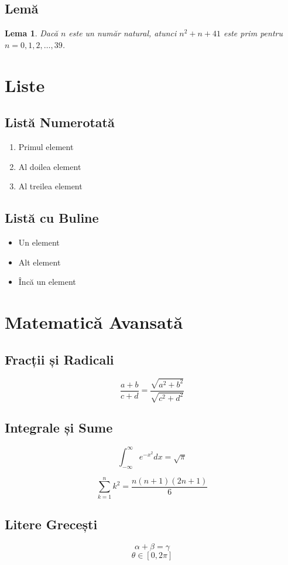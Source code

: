 \documentclass[12pt,a4paper]{article}
\newtheorem{lema}{Lema}
\begin{document}
\subsection{Lemă}
\begin{lema}
Dacă $n$ este un număr natural, atunci $n^2 + n + 41$ este prim pentru $n = 0, 1, 2, \ldots, 39$.
\end{lema}

\section{Liste}
\subsection{Listă Numerotată}
\begin{enumerate}
\item Primul element
\item Al doilea element
\item Al treilea element
\end{enumerate}

\subsection{Listă cu Buline}
\begin{itemize}
\item Un element
\item Alt element
\item Încă un element
\end{itemize}

\section{Matematică Avansată}
\subsection{Fracții și Radicali}
$$\frac{a + b}{c + d} = \frac{\sqrt{a^2 + b^2}}{\sqrt{c^2 + d^2}}$$

\subsection{Integrale și Sume}
$$\int_{-\infty}^{\infty} e^{-x^2} dx = \sqrt{\pi}$$

$$\sum_{k=1}^{n} k^2 = \frac{n(n+1)(2n+1)}{6}$$

\subsection{Litere Grecești}
$$\alpha + \beta = \gamma$$
$$\theta \in [0, 2\pi]$$
\end{document}
